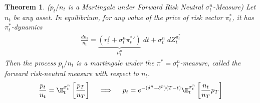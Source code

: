 \documentclass[12pt]{article}
\theoremstyle{plain}
\newtheorem{thm}{Theorem}[section]
\theoremstyle{definition}
\theoremstyle{remark}
\begin{document}
\begin{thm}
\emph{($p_t/n_t$ is a Martingale under Forward Risk Neutral $\sigma_t^n$-Measure)}
\label{thm:martingalepricing}
Let $n_t$ be any asset.
In equilibrium, for any value of the price of risk vector $\pi_t^*$, it
has $\pi_t^*$-dynamics
\begin{align*}
  \frac{dn_t}{n_t}
  =
  \underbrace{(r_t^f+\sigma_t^n\pi_t^*{}')}_{\mu_t^n}\;dt
  + \sigma_t^n\;dZ_t^{\pi_t^*}
\end{align*}
Then the process $p_t/n_t$ is a martingale under the
$\pi^*=\sigma_t^n$-measure,
called the
\emph{forward risk-neutral measure with respect to $n_t$}.
\begin{align}
  \frac{p_t}{n_t}
  = \E^{\sigma_t^n}_t\left[\frac{p_T}{n_T}\right]
  \quad\implies\quad
  p_t
  =
  e^{-(\delta^n-\delta^p)(T-t)}
  \E^{\sigma_t^n}_t\left[\frac{n_t}{n_T}p_T\right]
  \label{martprice}
\end{align}
\end{thm}
\end{document}
